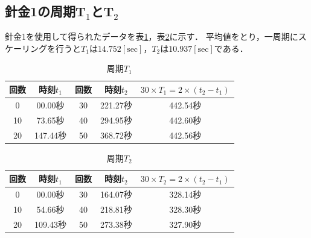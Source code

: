 \documentclass[a4paper,11pt]{ltjsarticle}
\begin{document}
\subsection{針金1の周期T$_1$とT$_2$}
針金1を使用して得られたデータを表\ref{tab:metal1T1}，表\ref{tab:metal1T2}に示す．
平均値をとり，一周期にスケーリングを行うと$T_1$は$14.752[\mathrm{sec}]$，$T_2$は$10.937[\mathrm{sec}]$である．
\begin{table}[H]
  \centering
  \caption{周期$T_1$}
  \label{tab:metal1T1}

  \begin{tabular}{c|c|c|c|c}
    \hline
    回数 & 時刻$t_1$ & 回数 & 時刻$t_2$ & $30 \times T_1 = 2 \times (t_2 - t_1)$ \\
    \hline
    0  & 00.00秒  & 30 & 221.27秒 & 442.54秒                                \\
    \hline
    10 & 73.65秒  & 40 & 294.95秒 & 442.60秒                                \\
    \hline
    20 & 147.44秒 & 50 & 368.72秒 & 442.56秒                                \\
    \hline
  \end{tabular}
\end{table}
\begin{table}[H]
  \centering
  \caption{周期$T_2$}
  \label{tab:metal1T2}

  \begin{tabular}{c|c|c|c|c}
    \hline
    回数 & 時刻$t_1$ & 回数 & 時刻$t_2$ & $30 \times T_2 = 2 \times (t_2 - t_1)$ \\
    \hline
    0  & 00.00秒  & 30 & 164.07秒 & 328.14秒                                \\
    \hline
    10 & 54.66秒  & 40 & 218.81秒 & 328.30秒                                \\
    \hline
    20 & 109.43秒 & 50 & 273.38秒 & 327.90秒                                \\
    \hline
  \end{tabular}
\end{table}
\end{document}
